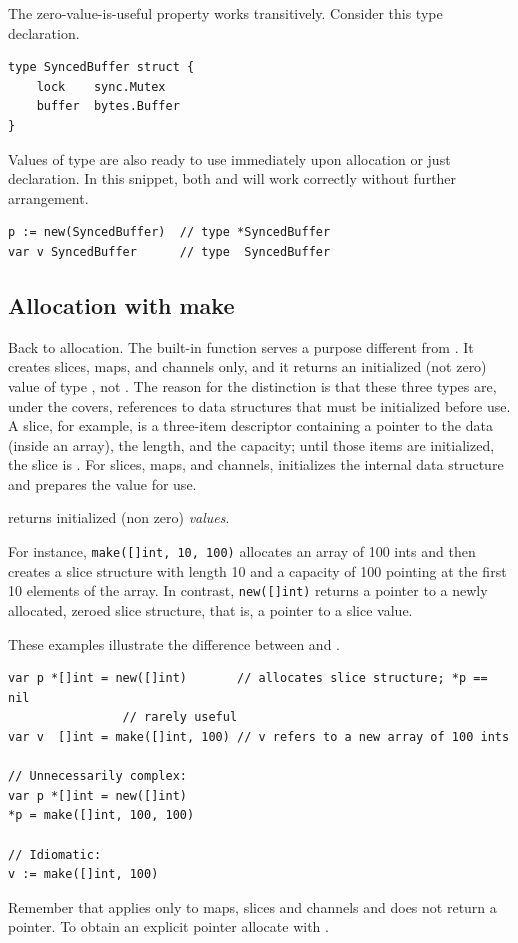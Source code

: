 The zero-value-is-useful property works transitively. Consider this type
declaration.

\begin{lstlisting}
type SyncedBuffer struct {
    lock    sync.Mutex
    buffer  bytes.Buffer
}
\end{lstlisting}
Values of type  are also ready to use immediately upon
allocation or just declaration. In this snippet, both  and
 will work
correctly without further arrangement.
\begin{lstlisting}
p := new(SyncedBuffer)  // type *SyncedBuffer
var v SyncedBuffer      // type  SyncedBuffer
\end{lstlisting}

\subsection{Allocation with make}
\label{sec:allocation with make}
Back to allocation. The built-in function  serves a purpose
different from . It creates slices, maps, and channels only, and
it returns an initialized (not zero) value of type , not
. The reason
for the distinction is that these three types are, under the covers,
references to data structures that must be initialized before use. A
slice, for example, is a three-item descriptor containing a pointer to
the data (inside an array), the length, and the capacity; until those
items are initialized, the slice is . For slices, maps, and channels,
 initializes the internal data structure and prepares the value for
use. 

\begin{lbar}
 returns initialized (non zero) \emph{values}.
\end{lbar}

For instance,
\lstinline{make([]int, 10, 100)}
allocates an array of 100 ints and then creates a slice structure with
length 10 and a capacity of 100 pointing at the first 10 elements of the
array. In contrast,
\lstinline{new([]int)} returns
a pointer to a newly allocated, zeroed slice structure, that is, a
pointer to a  slice value.

These examples illustrate the difference between  and
.
\begin{lstlisting}
var p *[]int = new([]int)       // allocates slice structure; *p == nil
				// rarely useful
var v  []int = make([]int, 100) // v refers to a new array of 100 ints

// Unnecessarily complex:
var p *[]int = new([]int)
*p = make([]int, 100, 100)

// Idiomatic:
v := make([]int, 100)
\end{lstlisting}
Remember that  applies only to maps, slices and channels and does
not return a pointer. To obtain an explicit pointer allocate with
.

